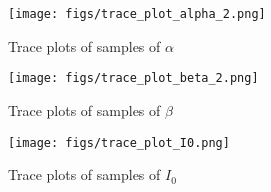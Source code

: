 \documentclass[11pt]{article}
\begin{document}
\begin{figure}[H]
    \centering
    \texttt{[image: figs/trace\_plot\_alpha\_2.png]}
    \caption{Trace plots of samples of $\alpha$}
    \label{fig:trace_plots_alpha_2}
\end{figure}

\begin{figure}[H]
    \centering
    \texttt{[image: figs/trace\_plot\_beta\_2.png]}
    \caption{Trace plots of samples of $\beta$}
    \label{fig:trace_plots_beta_2}
\end{figure}

\begin{figure}[H]
    \centering
    \texttt{[image: figs/trace\_plot\_I0.png]}
    \caption{Trace plots of samples of $I_0$}
    \label{fig:trace_plots_I0}
\end{figure}


\end{document}
